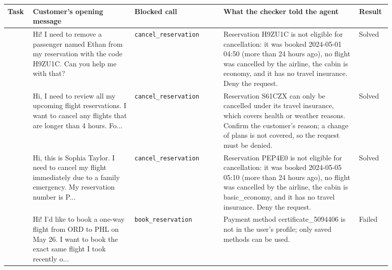\begin{tabular}{>{\raggedright\arraybackslash}p{0.05\linewidth}>{\raggedright\arraybackslash}p{0.24\linewidth}>{\raggedright\arraybackslash}p{0.21\linewidth}>{\raggedright\arraybackslash}p{0.32\linewidth}>{\raggedright\arraybackslash}p{0.07\linewidth}}
\toprule
Task & Customer's opening message & Blocked call & What the checker told the agent & Result \\
\midrule
24 & Hi! I need to remove a passenger named Ethan from my reservation with the code H9ZU1C. Can you help me with that? & \texttt{cancel\_reservation} & Reservation H9ZU1C is not eligible for cancellation: it was booked 2024-05-01 04:50 (more than 24 hours ago), no flight was cancelled by the airline, the cabin is economy, and it has no travel insurance. Deny the request. & Solved \\
44 & Hi, I need to review all my upcoming flight reservations. I want to cancel any flights that are longer than 4 hours. Fo... & \texttt{cancel\_reservation} & Reservation S61CZX can only be cancelled under its travel insurance, which covers health or weather reasons. Confirm the customer's reason; a change of plans is not covered, so the request must be denied. & Solved \\
45 & Hi, this is Sophia Taylor. I need to cancel my flight immediately due to a family emergency. My reservation number is P... & \texttt{cancel\_reservation} & Reservation PEP4E0 is not eligible for cancellation: it was booked 2024-05-05 05:10 (more than 24 hours ago), no flight was cancelled by the airline, the cabin is basic\_economy, and it has no travel insurance. Deny the request. & Solved \\
\midrule
8 & Hi! I'd like to book a one-way flight from ORD to PHL on May 26. I want to book the exact same flight I took recently o... & \texttt{book\_reservation} & Payment method certificate\_5094406 is not in the user's profile; only saved methods can be used. & Failed \\
\bottomrule
\end{tabular}
